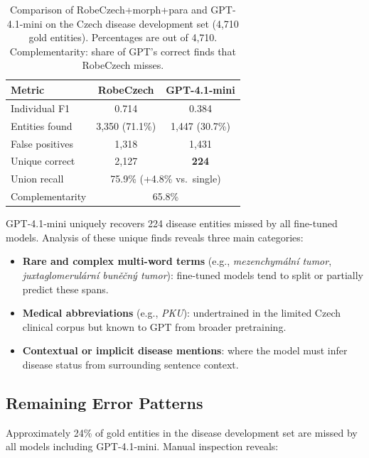 \documentclass[11pt]{article}
\begin{document}
\begin{table}[h]
\centering
\small
\begin{tabular}{lcc}
\toprule
\textbf{Metric} & \textbf{RobeCzech} & \textbf{GPT-4.1-mini} \\
\midrule
Individual F1      & 0.714  & 0.384 \\
Entities found     & 3,350 (71.1\%)  & 1,447 (30.7\%) \\
False positives    & 1,318  & 1,431 \\
Unique correct     & 2,127  & \textbf{224} \\
\midrule
Union recall       & \multicolumn{2}{c}{75.9\% (+4.8\% vs.\ single)} \\
Complementarity    & \multicolumn{2}{c}{65.8\%} \\
\bottomrule
\end{tabular}
\caption{Comparison of RobeCzech+morph+para and GPT-4.1-mini on the Czech disease
development set (4,710 gold entities). Percentages are out of 4,710.
Complementarity: share of GPT's correct finds that RobeCzech misses.}
\label{tab:gpt_analysis}
\end{table}

GPT-4.1-mini uniquely recovers 224 disease entities missed by all fine-tuned models.
Analysis of these unique finds reveals three main categories:

\begin{itemize}
  \item \textbf{Rare and complex multi-word terms} (e.g., \textit{mezenchymální tumor},
        \textit{juxtaglomerulární buněčný tumor}): fine-tuned models tend to split or
        partially predict these spans.
  \item \textbf{Medical abbreviations} (e.g., \textit{PKU}): undertrained in the
        limited Czech clinical corpus but known to GPT from broader pretraining.
  \item \textbf{Contextual or implicit disease mentions}: where the model must infer
        disease status from surrounding sentence context.
\end{itemize}

\subsection{Remaining Error Patterns}

Approximately 24\% of gold entities in the disease development set are missed by all
models including GPT-4.1-mini. Manual inspection reveals:
\end{document}
